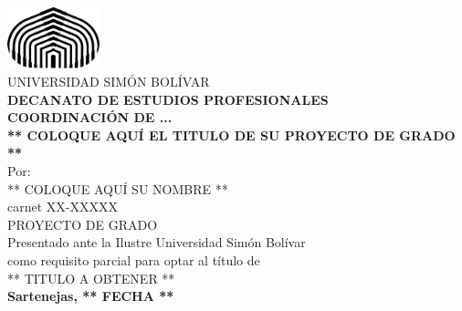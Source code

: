 \thispagestyle{empty}
\begin{center}
\includegraphics[width=0.20\textwidth]{Figuras/USB_logo.eps}\\ %
{\large UNIVERSIDAD SIMÓN BOLÍVAR}\\\textbf{DECANATO DE ESTUDIOS PROFESIONALES}\\\textbf{COORDINACIÓN DE ...} %
\\[8\baselineskip]

\textbf{** COLOQUE AQUÍ EL TITULO DE SU PROYECTO DE GRADO **}
\\[2\baselineskip]

Por:\\ ** COLOQUE AQUÍ SU NOMBRE **\\ carnet XX-XXXXX
\\[8\baselineskip]

PROYECTO DE GRADO\\Presentado ante la Ilustre Universidad Simón Bolívar\\como requisito parcial para optar al título de \\** TITULO A OBTENER **
\\[2\baselineskip]

\textbf{Sartenejas, ** FECHA **}
\end{center}